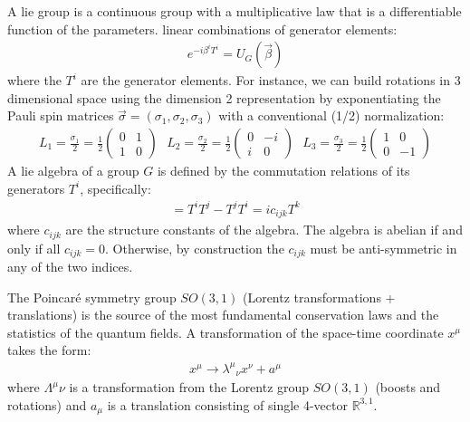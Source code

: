A lie group is a continuous group with a multiplicative 
law that is a differentiable function of the parameters. linear combinations of generator elements:
\begin{align*}
e^{-i\beta^i T^i} = U_{G}(\vec \beta)
\end{align*}
where the $T^i$ are the generator elements. 
For instance, we can build rotations in 3 dimensional space 
using the dimension 2 representation by exponentiating the Pauli spin matrices $\vec \sigma = (\sigma_1, \sigma_2, \sigma_3)$ 
with a conventional (1/2) normalization:
\begin{align*}
L_1 = \frac{\sigma_1}{2} = \frac{1}{2} \begin{pmatrix} 0 & 1 \\ 1 & 0 \end{pmatrix} \text{  }
L_2 = \frac{\sigma_2}{2} = \frac{1}{2} \begin{pmatrix} 0 & -i \\ i & 0 \end{pmatrix} \text{  } 
L_3 = \frac{\sigma_3}{2} =  \frac{1}{2} \begin{pmatrix} 1 & 0 \\ 0 & -1 \end{pmatrix} 
\end{align*}
A lie algebra of a group $G$ is defined by the commutation relations of its generators $T^i$, 
specifically:
\begin{align*}
[T^i, T^j] = T^iT^j - T^jT^i=  i c_{ijk} T^k
\end{align*}
where $c_{ijk}$ are the structure constants of the algebra. The algebra is abelian 
if and only if all $c_{ijk}=0$. Otherwise, by construction the $c_{ijk}$ must be anti-symmetric
 in any of the two indices. 

The Poincar\'e symmetry group $SO(3,1)$ (Lorentz transformations + translations) is the source  of the most fundamental conservation laws 
and the statistics of the quantum fields. A  transformation of the space-time coordinate $x^\mu$ takes the form:
\begin{align*}
x^\mu \rightarrow \lambda^\mu{}_\nu x^\nu + a^\mu 
\end{align*}
where $\Lambda^\mu_{}\nu$ is a transformation from the Lorentz group $SO(3,1)$ (boosts and rotations) and 
$a_\mu$ is a translation consisting of single 4-vector $\mathbb{R}^{3,1}$. 

